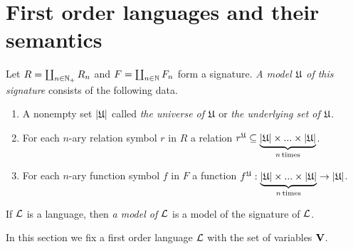 \documentclass[10pt]{amsart}
\begin{document}
\section{First order languages and their semantics}

\begin{definition}
	Let $R = \coprod_{n\in {\mathbb N}_+}R_n$ and $F = \coprod_{n\in {\mathbb N}}F_n$ form a signature. \textit{A model ${\mathfrak U}$ of this signature} consists of the following data.
	\begin{enumerate}[label=\textbf{(\arabic*)}, leftmargin=3.0em]
		\item A nonempty set $|{\mathfrak U}|$ called \textit{the universe of ${\mathfrak U}$} or \textit{the underlying set of ${\mathfrak U}$}.
		\item For each $n$-ary relation symbol $r$ in $R$ a relation $r^{\mathfrak U} \subseteq \underbrace{|{\mathfrak U}| \times ... \times |{\mathfrak U}|}_{n\,\mathrm{times}}$.
		\item For each $n$-ary function symbol $f$ in $F$ a function $f^{\mathfrak U}:\underbrace{|{\mathfrak U}| \times ... \times |{\mathfrak U}|}_{n\,\mathrm{times}} \rightarrow |{\mathfrak U}|$.
	\end{enumerate}
	If ${\mathcal L}$ is a language, then \textit{a model of ${\mathcal L}$} is a model of the signature of ${\mathcal L}$.
\end{definition}
\noindent
In this section we fix a first order language ${\mathcal L}$ with the set of variables $\mathbf{V}$.
\end{document}

